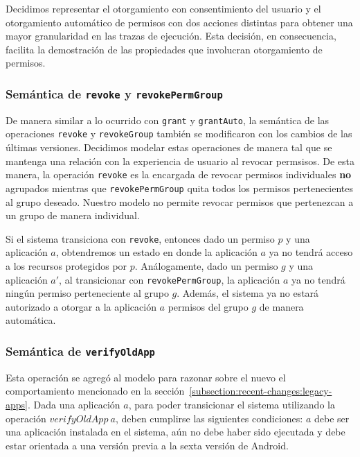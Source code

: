 Decidimos representar el otorgamiento con consentimiento del usuario y el otorgamiento automático de
permisos con dos acciones distintas para obtener una mayor granularidad en las trazas de ejecución.
Esta decisión, en consecuencia, facilita la demostración de las propiedades que involucran
otorgamiento de permisos.

\subsubsection{Semántica de \texttt{revoke} y \texttt{revokePermGroup}}

De manera similar a lo ocurrido con \texttt{grant} y \texttt{grantAuto}, la semántica de las
operaciones  \texttt{revoke} y \texttt{revokeGroup} también se modificaron con los cambios de las
últimas versiones. Decidimos modelar estas operaciones de manera tal que se mantenga una relación
con la experiencia de usuario al revocar permsisos. De esta manera, la operación \texttt{revoke} es
la encargada de revocar permisos individuales \textbf{no} agrupados mientras que
\texttt{revokePermGroup} quita todos los permisos pertenecientes al grupo deseado. Nuestro modelo no
permite revocar permisos que pertenezcan a un grupo de manera individual.

Si el sistema transiciona con \texttt{revoke}, entonces dado un permiso $p$ y una aplicación $a$,
obtendremos un estado en donde la aplicación $a$ ya no tendrá acceso a los recursos protegidos por
$p$. Análogamente, dado un permiso $g$ y una aplicación $a'$, al transicionar con
\texttt{revokePermGroup}, la aplicación $a$ ya no tendrá ningún permiso perteneciente al grupo $g$.
Además, el sistema ya no estará autorizado a otorgar a la aplicación $a$ permisos del grupo $g$ de
manera automática.


\subsubsection{Semántica de \texttt{verifyOldApp}}

Esta operación se agregó al modelo para razonar sobre el nuevo el comportamiento mencionado en la
sección~\ref{subsection:recent-changes:legacy-apps}. Dada una aplicación $a$, para poder
transicionar el sistema utilizando la operación $verifyOldApp\ a$, deben cumplirse las siguientes
condiciones: $a$ debe ser una aplicación instalada en el sistema, aún no debe haber sido ejecutada y
debe estar orientada a una versión previa a la sexta versión de Android.

